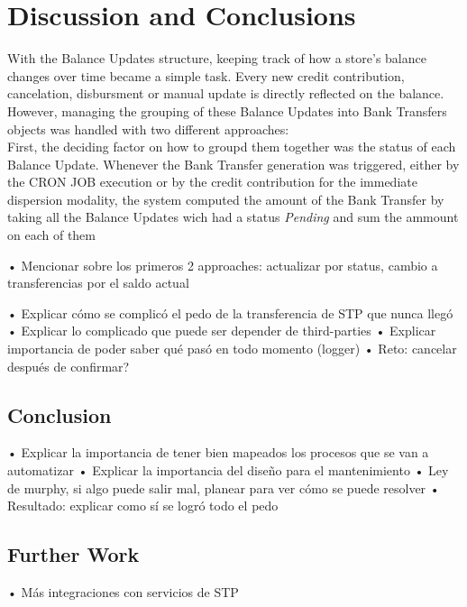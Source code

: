 
\chapter{Discussion and Conclusions}

With the Balance Updates structure, keeping track of how a store's balance changes over time became a simple task. Every new credit contribution, cancelation, disbursment or manual update is directly reflected on the balance. However, managing the grouping of these Balance Updates into Bank Transfers objects was handled with two different approaches:\\

First, the deciding factor on how to groupd them together was the status of each Balance Update. Whenever the Bank Transfer generation was triggered, either by the CRON JOB execution or by the credit contribution for the immediate dispersion modality, the system computed the amount of the Bank Transfer by taking all the Balance Updates wich had a status \textit{Pending} and sum the ammount on each of them 

• Mencionar sobre los primeros 2 approaches: actualizar por status, cambio a transferencias por el saldo actual



• Explicar cómo se complicó el pedo de la transferencia de STP que nunca llegó
• Explicar lo complicado que puede ser depender de third-parties
• Explicar importancia de poder saber qué pasó en todo momento (logger)
• Reto: cancelar después de confirmar?



\section{Conclusion}

• Explicar la importancia de tener bien mapeados los procesos que se van a automatizar
• Explicar la importancia del diseño para el mantenimiento
• Ley de murphy, si algo puede salir mal, planear para ver cómo se puede resolver
• Resultado: explicar como sí se logró todo el pedo

\section{Further Work}

• Más integraciones con servicios de STP

